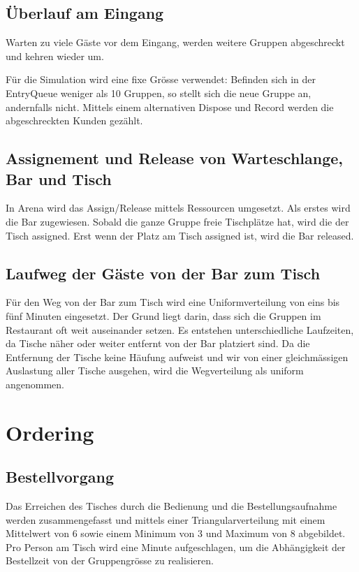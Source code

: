 \documentclass[ngerman,a4paper,12pt]{scrreprt}
\begin{document}
		\subsection{Überlauf am Eingang}
			Warten zu viele Gäste vor dem Eingang, werden weitere Gruppen abgeschreckt und kehren wieder um.
		
			Für die Simulation wird eine fixe Grösse verwendet: 			Befinden sich in der EntryQueue weniger als 10 Gruppen, so stellt sich die neue Gruppe an, andernfalls nicht. Mittels einem alternativen Dispose und Record werden die abgeschreckten Kunden gezählt.
			
			
		\subsection{Assignement und Release von Warteschlange, Bar und Tisch}
			In Arena wird das Assign/Release mittels Ressourcen umgesetzt. Als erstes wird die Bar zugewiesen. Sobald die ganze Gruppe freie Tischplätze hat, wird die der Tisch assigned. Erst wenn der Platz am Tisch assigned ist, wird die Bar released.
	
	
		\subsection{Laufweg der Gäste von der Bar zum Tisch}
			Für den Weg von der Bar zum Tisch wird eine Uniformverteilung von eins bis fünf Minuten eingesetzt. Der Grund liegt darin, dass sich die Gruppen im Restaurant oft weit auseinander setzen. Es entstehen unterschiedliche Laufzeiten, da Tische näher oder weiter entfernt von der Bar platziert sind. Da die Entfernung der Tische keine Häufung aufweist und wir von einer gleichmässigen Auslastung aller Tische ausgehen, wird die Wegverteilung als uniform angenommen.
	
	
	\section{Ordering}			
		\subsection{Bestellvorgang}
			Das Erreichen des Tisches durch die Bedienung und die Bestellungsaufnahme werden zusammengefasst und mittels einer Triangularverteilung mit einem Mittelwert von 6 sowie einem Minimum von 3 und Maximum von 8 abgebildet. Pro Person am Tisch wird eine Minute aufgeschlagen, um die Abhängigkeit der Bestellzeit von der Gruppengrösse zu realisieren.
			
\end{document}

